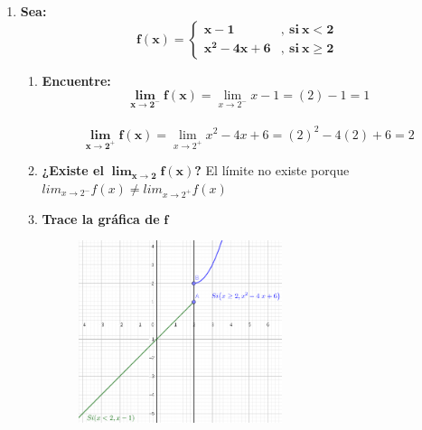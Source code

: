 \documentclass[12pt]{article}
\begin{document}
\begin{enumerate}[label=\textbf{\arabic*.}]
            \vspace{1cm}\hrule
            \item \textbf{Sea: }
                \[
                    \boldsymbol{
                        f(x) = 
                        \left\{
                            \begin{array}{ll}
                                x - 1 & ,\ \text{si} \ x < 2 \\
                                x ^2 - 4x + 6 & ,\ \text{si} \ x \geq 2
                            \end{array}
                        \right.
                    }
                \]

                \begin{enumerate}[label=\textbf{(\alph*)}]
                    \item \textbf{Encuentre:} \[\bm{\lim_{x \to 2^-} f(x)} = \lim_{x \to 2^-} x - 1 = (2) - 1 = 1\] \vspace{0.2cm}\\ \[\bm{\lim_{x \to 2^+} f(x)} = \lim_{x \to 2^+} x ^2 - 4x + 6 = (2)^2 - 4(2) + 6 = 2\]
                    \item \textbf{¿Existe el} $\bm{\lim_{x \to 2} f(x)}$\textbf{?} El límite no existe porque $lim_{x \to 2^-} f(x) \neq lim_{x \to 2^+} f(x)$
                    \item \textbf{Trace la gráfica de} $\bm{f}$
                        \begin{figure}[h!]
                            \centering
                            \includegraphics[width=0.6\textwidth]{img/t1-ej8.png}
                        \end{figure}
                \end{enumerate}


\end{enumerate}
\end{document}
